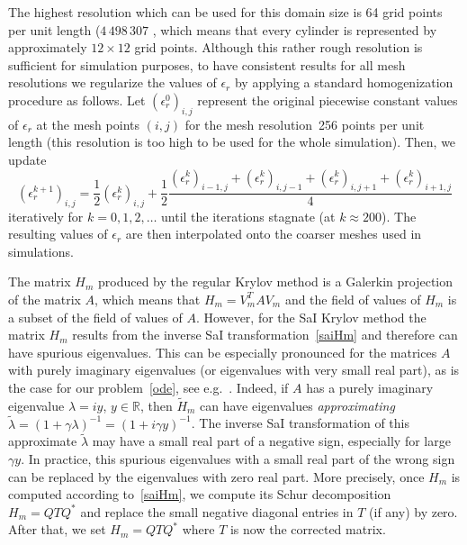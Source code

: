 \documentclass[11pt]{elsarticle}
\newcommand{\Rr}{\mathbb{R}}
\begin{document}
The highest resolution which can be used for this domain size 
is 64 grid points per unit length ($4\,498\,307$ , which means that every 
cylinder
is represented by approximately $12\times 12$ grid points.
Although this rather rough resolution is sufficient for simulation
purposes, to have consistent results for all mesh resolutions
we regularize the values of $\epsilon_r$ by applying
a standard homogenization procedure as follows.  Let 
$(\epsilon_r^0)_{i,j}$ represent the original piecewise 
constant values of $\epsilon_r$  at the mesh points $(i,j)$
for the mesh resolution~256 points per unit length (this 
resolution is too high to be used for the whole simulation). 
Then, we update 
$$
(\epsilon_r^{k+1})_{i,j} = 
\frac12 (\epsilon_r^k)_{i,j} +
\frac12 \frac{(\epsilon_r^k)_{i-1,j} + (\epsilon_r^k)_{i,j-1} + 
              (\epsilon_r^k)_{i,j+1} + (\epsilon_r^k)_{i+1,j}}4
$$
iteratively for $k=0,1,2,\dots$ until the iterations stagnate
(at $k\approx 200$).
The resulting values of $\epsilon_r$ are then interpolated
onto the coarser meshes used in simulations.


The matrix $H_m$ produced by the regular Krylov method is 
a Galerkin projection of the matrix $A$, which means that
$H_m=V_m^T A V_m$ and the field of values of $H_m$ is
a subset of the field of values of $A$.
However, for the SaI Krylov method the matrix $H_m$
results from the inverse SaI transformation~\eqref{saiHm}
and therefore can have spurious eigenvalues.
This can be especially pronounced for the matrices $A$ with
purely imaginary eigenvalues (or eigenvalues with very small
real part), as is the case for our problem~\eqref{ode}, 
see e.g.~\cite{Botchev2016}.
Indeed, if $A$ has a purely imaginary eigenvalue $\lambda=iy$, $y\in\Rr$,
then $\tilde{H}_m$ can have eigenvalues \emph{approximating}
$\tilde{\lambda}=(1+\gamma\lambda)^{-1}=(1+i\gamma y)^{-1}$.  
The inverse SaI transformation of this approximate $\tilde{\lambda}$
may have a small real part of a negative sign, especially for large
$\gamma y$.
In practice, this spurious eigenvalues with a small real part of the wrong
sign can be replaced by the eigenvalues with zero real part.
More precisely, once $H_m$ is computed according to~\eqref{saiHm},
we compute its Schur decomposition $H_m=QTQ^*$ and replace
the small negative diagonal entries in $T$ (if any) by zero.
After that, we set $H_m=QTQ^*$ where $T$ is now the corrected
matrix.
\end{document}
